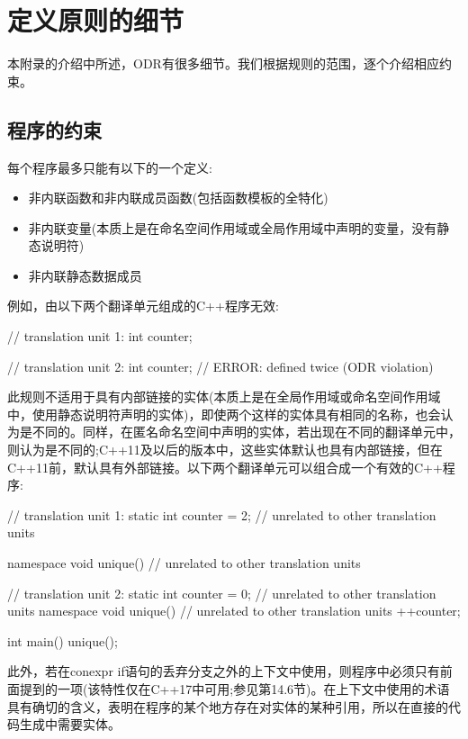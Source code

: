 \section{定义原则的细节}

本附录的介绍中所述，ODR有很多细节。我们根据规则的范围，逐个介绍相应约束。

\subsection{程序的约束}

每个程序最多只能有以下的一个定义:

\begin{itemize}
\item 
非内联函数和非内联成员函数(包括函数模板的全特化)

\item 
非内联变量(本质上是在命名空间作用域或全局作用域中声明的变量，没有静态说明符)

\item 
非内联静态数据成员
\end{itemize}

例如，由以下两个翻译单元组成的C++程序无效:

\begin{cpp}
// translation unit 1:
int counter;

// translation unit 2:
int counter; // ERROR: defined twice (ODR violation)
\end{cpp}

此规则不适用于具有内部链接的实体(本质上是在全局作用域或命名空间作用域中，使用静态说明符声明的实体)，即使两个这样的实体具有相同的名称，也会认为是不同的。同样，在匿名命名空间中声明的实体，若出现在不同的翻译单元中，则认为是不同的;C++11及以后的版本中，这些实体默认也具有内部链接，但在C++11前，默认具有外部链接。以下两个翻译单元可以组合成一个有效的C++程序:

\begin{cpp}
// translation unit 1:
static int counter = 2; // unrelated to other translation units

namespace {
	void unique() // unrelated to other translation units
	{ }
}

// translation unit 2:
static int counter = 0; // unrelated to other translation units
namespace {
	void unique() // unrelated to other translation units
	{
		++counter;
	}
}

int main()
{
	unique();
}
\end{cpp}

此外，若在conexpr if语句的丢弃分支之外的上下文中使用，则程序中必须只有前面提到的一项(该特性仅在C++17中可用;参见第14.6节)。在上下文中使用的术语具有确切的含义，表明在程序的某个地方存在对实体的某种引用，所以在直接的代码生成中需要实体。

